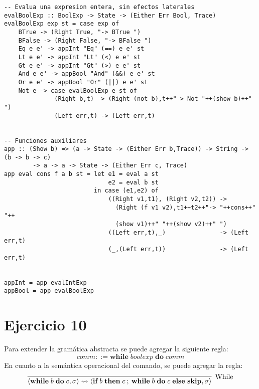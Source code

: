 \documentclass[12pt,a4paper]{article}
\begin{document}
\begin{verbatim}
-- Evalua una expresion entera, sin efectos laterales
evalBoolExp :: BoolExp -> State -> (Either Err Bool, Trace) 
evalBoolExp exp st = case exp of
    BTrue -> (Right True, "-> BTrue ")
    BFalse -> (Right False, "-> BFalse ")
    Eq e e' -> appInt "Eq" (==) e e' st 
    Lt e e' -> appInt "Lt" (<) e e' st 
    Gt e e' -> appInt "Gt" (>) e e' st 
    And e e' -> appBool "And" (&&) e e' st
    Or e e' -> appBool "Or" (||) e e' st
    Not e -> case evalBoolExp e st of
              (Right b,t) -> (Right (not b),t++"-> Not "++(show b)++" ")
              (Left err,t) -> (Left err,t)


-- Funciones auxiliares
app :: (Show b) => (a -> State -> (Either Err b,Trace)) -> String -> (b -> b -> c)
        -> a -> a -> State -> (Either Err c, Trace)
app eval cons f a b st = let e1 = eval a st
                             e2 = eval b st
                         in case (e1,e2) of
                             ((Right v1,t1), (Right v2,t2)) ->
                               (Right (f v1 v2),t1++t2++"-> "++cons++" "++
                               (show v1)++" "++(show v2)++" ")
                             ((Left err,t),_)               -> (Left err,t)
                             (_,(Left err,t))               -> (Left err,t)


appInt = app evalIntExp
appBool = app evalBoolExp

\end{verbatim}

\section*{Ejercicio 10}
Para extender la gram\'atica abstracta se puede agregar la siguiente regla:
$$ comm ::= \textbf{while}\;boolexp\;\textbf{do}\;comm $$
En cuanto a la sem\'antica operacional del comando, se puede agregar la
regla:
$$ \infer[\mathrm{While}]
         {\langle \textbf{while}\;b\;\textbf{do}\;c,\sigma \rangle
          \rightsquigarrow \langle \textbf{if}\;b\;\textbf{then}\;
          c\:;\:\textbf{while}\;b\;\textbf{do}\;c\;\textbf{else\;skip},
          \sigma \rangle}{}
$$
\end{document}
